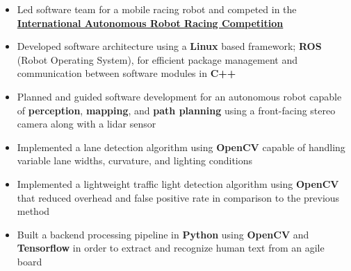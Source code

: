 

\begin{itemize}
\item Led software team for a mobile racing robot and competed in the \href{https://iarrc.org/}{\textbf{International Autonomous Robot Racing Competition}}
\item Developed software architecture using a \textbf{Linux} based framework; \textbf{ROS} (Robot Operating System), for efficient package management and communication between software modules in \textbf{C++}
\item Planned and guided software development for an autonomous robot capable of \textbf{perception}, \textbf{mapping}, and \textbf{path planning} using a front-facing stereo camera along with a lidar sensor
\item Implemented a lane detection algorithm using \textbf{OpenCV} capable of handling variable lane widths, curvature, and lighting conditions 
\item Implemented a lightweight traffic light detection algorithm using \textbf{OpenCV} that reduced overhead and false positive rate in comparison to the previous method
\end{itemize}


\begin{itemize}
\item Built a backend processing pipeline in \textbf{Python} using \textbf{OpenCV} and \textbf{Tensorflow} in order to extract and recognize human text from an agile board
\end{itemize}

